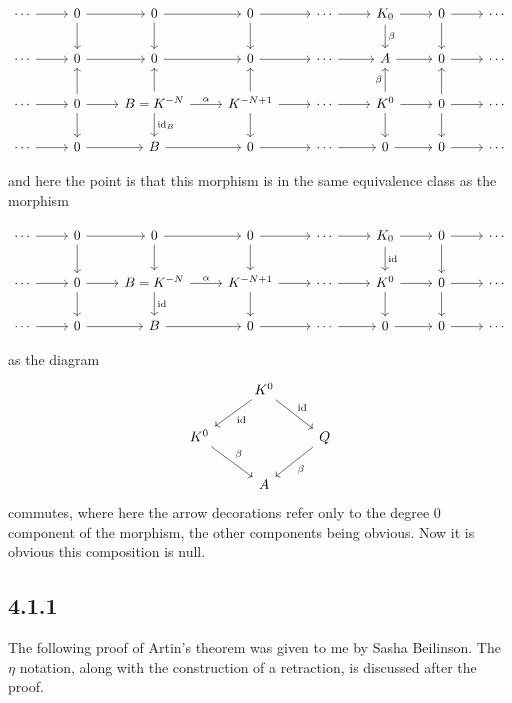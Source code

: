 \documentclass[deligne.tex]{subfiles}
\begin{document}
\begin{ceqn}\begin{equation*}\begin{tikzcd}
	\cdots\arrow[r]&0\arrow[r]\arrow[d]&0\arrow[r]\arrow[d]
	&0\arrow[r]\arrow[d]&\cdots\arrow[r]&K_0\arrow[r]\arrow[d,"\beta"]
	&0\arrow[r]\arrow[d]&\cdots \\
	\cdots\arrow[r]&0\arrow[r]&0\arrow[r]
	&0\arrow[r]&\cdots\arrow[r]&A\arrow[r]
	&0\arrow[r]&\cdots \\
	\cdots\arrow[r]&0\arrow[r]\arrow[u]\arrow[d]
	&B=K^{-N}\arrow[r,"\alpha"]\arrow[d,"\id_B"]\arrow[u]
	&K^{-N+1}\arrow[r]\arrow[d]\arrow[u]
	&\cdots\arrow[r]&K^0\arrow[r]\arrow[u,"\beta"]\arrow[d]
	&0\arrow[r]\arrow[d]\arrow[u]&\cdots \\
	\cdots\arrow[r]&0\arrow[r]
	&B\arrow[r]
	&0\arrow[r]&\cdots\arrow[r]
	&0\arrow[r]
	&0\arrow[r]&\cdots
\end{tikzcd}\end{equation*}\end{ceqn}
and here the point is that this morphism is in the same equivalence class
as the morphism
\begin{ceqn}\begin{equation*}\begin{tikzcd}
	\cdots\arrow[r]&0\arrow[r]\arrow[d]&0\arrow[r]\arrow[d]
	&0\arrow[r]\arrow[d]&\cdots\arrow[r]&K_0\arrow[r]\arrow[d,"\id"]
	&0\arrow[r]\arrow[d]&\cdots \\
	\cdots\arrow[r]&0\arrow[r]\arrow[d]
	&B=K^{-N}\arrow[r,"\alpha"]\arrow[d,"\id"]
	&K^{-N+1}\arrow[r]\arrow[d]
	&\cdots\arrow[r]&K^0\arrow[r]\arrow[d]
	&0\arrow[r]\arrow[d]&\cdots \\
	\cdots\arrow[r]&0\arrow[r]
	&B\arrow[r]
	&0\arrow[r]&\cdots\arrow[r]
	&0\arrow[r]
	&0\arrow[r]&\cdots
\end{tikzcd}\end{equation*}\end{ceqn}
as the diagram
\begin{equation*}\begin{tikzcd}
	&K^0\arrow[dl,"\id"]\arrow[dr,"\id"] \\
	K^0\arrow[dr,"\beta"]&&Q\arrow[dl,"\beta"] \\
	&A
\end{tikzcd}\end{equation*}
commutes, where here the arrow decorations refer only to the degree 0
component of the morphism, the other components being obvious.
Now it is obvious this composition is null.

\subsection*{4.1.1} The following proof of Artin's theorem was given to me
by Sasha Beilinson. The $\eta$ notation, along with the
construction of a retraction, is discussed after the proof.
\end{document}

